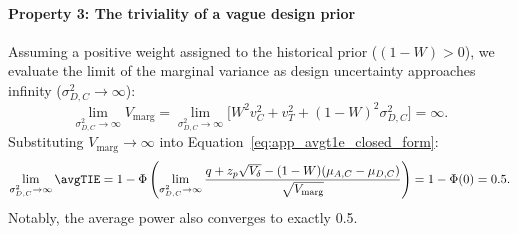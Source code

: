 \paragraph{Property 3: The triviality of a vague design prior}
Assuming a positive weight assigned to the historical prior ($(1 - W) > 0$), we evaluate the limit of the marginal variance as design uncertainty approaches infinity ($\sigma_{D,C}^2 \to \infty$):
$$
    \lim_{\sigma_{D,C}^2 \to \infty} V_{\text{marg}} = \lim_{\sigma_{D,C}^2 \to \infty} \Big[ W^2 v_C^2 + v_T^2 + (1 - W)^2 \sigma_{D,C}^2 \Big] = \infty.
$$
Substituting $V_{\text{marg}} \to \infty$ into Equation~\eqref{eq:app_avgt1e_closed_form}:
$$
    \lim_{\sigma_{D,C}^2 \to \infty} \avgTIE = 1 - \Phi\left( \lim_{\sigma_{D,C}^2 \to \infty} \frac{q + z_p \sqrt{V_{\delta}} - (1 - W)(\mu_{A,C} - \mu_{D,C})}{\sqrt{V_{\text{marg}}}} \right) = 1 - \Phi(0) = 0.5.
$$
Notably, the average power also converges to exactly 0.5.






